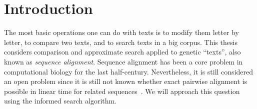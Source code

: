 \graphicspath{{\dir/}}


\chapter{Introduction} \label{ch:introduction}

The most basic operations one can do with texts is to modify them letter by
letter, to compare two texts, and to search texts in a big corpus. This thesis
considers comparison and approximate search applied to genetic ``texts'', also
known as \emph{sequence alignment}. Sequence alignment has been a core problem
in computational biology for the last half-century. Nevertheless, it is still
considered an open problem since it is still not known whether exact pairwise
alignment is possible in linear time for related
sequences~\citep{medvedev2022theoretical}. We will approach this question using
the \A informed search algorithm.







